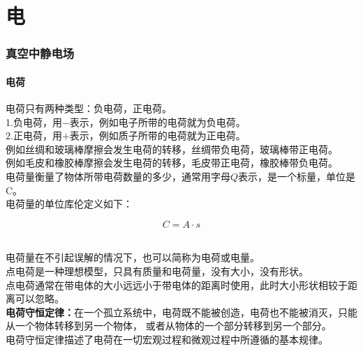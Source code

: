 \documentclass[UTF8]{ctexart}
\begin{document}
\newpage

\part{电}

\newpage

\section{真空中静电场}

\subsection{电荷}
    电荷只有两种类型：负电荷，正电荷。\\[3mm]
    1.负电荷，用$-$表示，例如电子所带的电荷就为负电荷。\\[3mm]
    2.正电荷，用$+$表示，例如质子所带的电荷就为正电荷。\\[3mm]
    例如丝绸和玻璃棒摩擦会发生电荷的转移，丝绸带负电荷，玻璃棒带正电荷。\\[3mm]
    例如毛皮和橡胶棒摩擦会发生电荷的转移，毛皮带正电荷，橡胶棒带负电荷。\\[6mm]
    电荷量衡量了物体所带电荷数量的多少，通常用字母$Q$表示，是一个标量，单位是\si{C}。\\[3mm]
    电荷量的单位库伦定义如下：
    \begin{large}
        \begin{equation*}
            C=A\cdot s
        \end{equation*}
    \end{large}\\
    电荷量在不引起误解的情况下，也可以简称为电荷或电量。\\[3mm]
    点电荷是一种理想模型，只具有质量和电荷量，没有大小，没有形状。\\[3mm]
    点电荷通常在带电体的大小远远小于带电体的距离时使用，此时大小形状相较于距离可以忽略。\\[6mm]
    \textbf{电荷守恒定律：}在一个孤立系统中，电荷既不能被创造，电荷也不能被消灭，只能从一个物体转移到另一个物体，
    或者从物体的一个部分转移到另一个部分。\\[3mm]
    电荷守恒定律描述了电荷在一切宏观过程和微观过程中所遵循的基本规律。\vspace{5pt}
\end{document}
